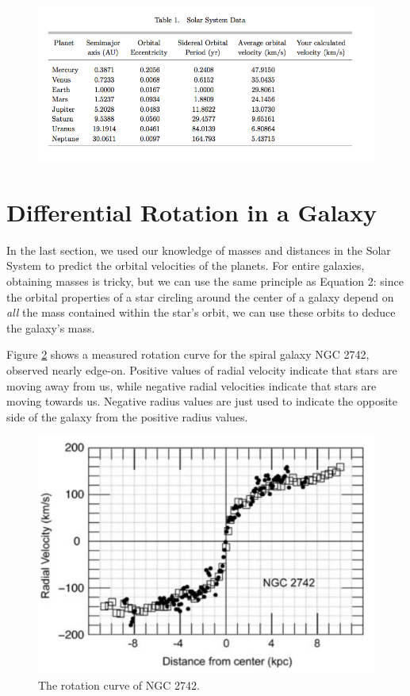\documentclass[11pt]{article}%
\begin{document}
\begin{figure}[h!] \label{tab:planets}
\center
\includegraphics[scale=0.55]{Images/table1.png}
\label{table1}
\end{figure}


\break
\section{Differential Rotation in a Galaxy}

\noindent
In the last section, we used our knowledge of masses and distances in the Solar System to predict the orbital velocities of the planets. For entire galaxies, obtaining masses is tricky, but we can use the same principle as Equation 2: since the orbital properties of a star circling around the center of a galaxy depend on \emph{all} the mass contained within the star's orbit, we can use these orbits to deduce the galaxy's mass. 

Figure \ref{fig:rotcurve} shows a measured rotation curve for the spiral galaxy NGC 2742, observed nearly edge-on. Positive values of radial velocity indicate that stars are moving away from us, while negative radial velocities indicate that stars are moving towards us. Negative radius values are just used to indicate the opposite side of the galaxy from the positive radius values. 

\begin{figure}[h!]
\center
\includegraphics[scale=0.6]{Images/rotation curve 2742.jpg}
\caption{The rotation curve of NGC 2742.}
\label{fig:rotcurve}
\end{figure}
\end{document}
